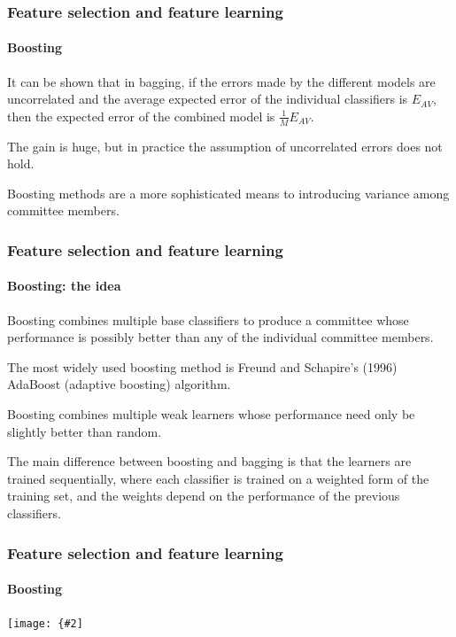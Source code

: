 \documentclass[aspectratio=169]{beamer}
\newcommand{\myfig}[3]{\centerline{\texttt{[image: \{\#2]}}}
\begin{document}
\begin{frame}
\frametitle{Feature selection and feature learning}
\framesubtitle{Boosting}

It can be shown that in bagging, if the \alert{errors made by the
  different models are uncorrelated} and the average expected error of
the individual classifiers is $E_{AV}$, then the expected error of the
combined model is $\frac{1}{M}E_{AV}$.

\medskip

The gain is huge, but in practice the assumption of uncorrelated
errors \alert{does not hold}.

\medskip

\alert{Boosting} methods are a more sophisticated means to introducing
variance among committee members.

\end{frame}


\begin{frame}
\frametitle{Feature selection and feature learning}
\framesubtitle{Boosting: the idea}

Boosting combines multiple \alert{base} classifiers to produce a
committee whose performance is possibly better than any of the
individual committee members.

\medskip

The most widely used boosting method is Freund and Schapire's (1996)
\alert{AdaBoost} (adaptive boosting) algorithm.

\medskip

Boosting combines multiple \alert{weak learners} whose performance need
only be \alert{slightly better than random}.

\medskip

The main difference between boosting and bagging is that the learners
are trained \alert{sequentially}, where each classifier is trained on
a \alert{weighted} form of the training set, and the weights
\alert{depend on the performance of the previous classifiers}.

\end{frame}


\begin{frame}
\frametitle{Feature selection and feature learning}
\framesubtitle{Boosting}

\myfig{3.25in}{Bishop-fig14-1.pdf}{Bishop (2006), Fig.\ 14.1}

\end{frame}
\end{document}
